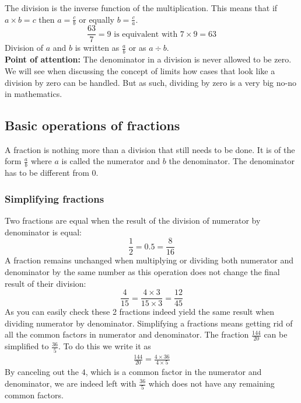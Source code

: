 \noindent The division is the inverse function of the multiplication. This means that if $a \times b = c$ then $a = \frac{c}{b}$ or equally $b = \frac{c}{a}$.
$$
\frac{63}{7} = 9 \text{ is equivalent with } 7 \times 9 = 63
$$
\noindent Division of $a$ and $b$ is written as $\frac{a}{b}$ or as $a \div b$.\\

\noindent \textbf{Point of attention:} The denominator in a division is never allowed to be zero. We will see when discussing the concept of limits how cases that look like a division by zero can be handled. But as such, dividing by zero is a very big no-no in mathematics.

\subsection{Basic operations of fractions}

\noindent A fraction is nothing more than a division that still needs to be done. It is of the form $\frac{a}{b}$ where $a$ is called the numerator and $b$ the denominator. The denominator has to be different from 0.

\subsubsection{Simplifying fractions}

\noindent Two fractions are equal when the result of the division of numerator by denominator is equal:
\begin{equation*}
\frac{1}{2} = 0.5 = \frac{8}{16}
\end{equation*}
A fraction remains unchanged when multiplying or dividing both numerator and denominator by the same number as this operation does not change the final result of their division:
\begin{equation*}
\frac{4}{15} = \frac{4 \times 3}{15 \times 3} = \frac{12}{45}
\end{equation*}
As you can easily check these 2 fractions indeed yield the same result when dividing numerator by denominator. Simplifying a fractions means getting rid of all the common factors in numerator and denominator. The fraction $\frac{144}{20}$ can be simplified to $\frac{36}{5}$. To do this we write it as
\begin{eqnarray*}
\frac{144}{20} = \frac{4 \times 36}{4 \times 5}
\end{eqnarray*}
\noindent By canceling out the $4$, which is a common factor in the numerator and denominator, we are indeed left with $\frac{36}{5}$ which does not have any remaining common factors.\\

